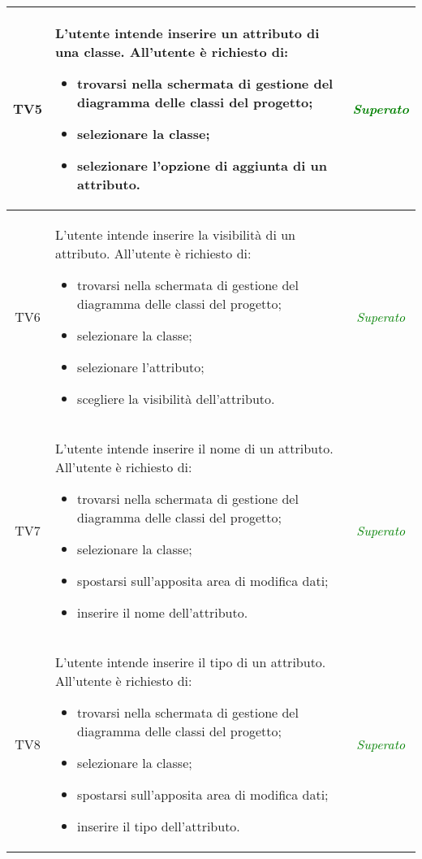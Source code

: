 \begin{longtable}{|c|>{}m{8cm}|c|}
\hypertarget{TV5}{TV5} & L'utente intende inserire un attributo di una classe.
All'utente è richiesto di:
\begin{itemize}
	\item trovarsi nella schermata di gestione del diagramma delle classi del progetto;
	\item selezionare la classe;
	\item selezionare l'opzione di aggiunta di un attributo.
\end{itemize} & \textcolor{Green}{\textit{Superato}}\\ \hline

\hypertarget{TV6}{TV6} & L'utente intende inserire la visibilità di un attributo.
All'utente è richiesto di:
\begin{itemize}
	\item trovarsi nella schermata di gestione del diagramma delle classi del progetto;
	\item selezionare la classe;
	\item selezionare l'attributo;
	\item scegliere la visibilità dell'attributo.
\end{itemize} & \textcolor{Green}{\textit{Superato}}\\ \hline

\hypertarget{TV7}{TV7} & L'utente intende inserire il nome di un attributo.
All'utente è richiesto di:
\begin{itemize}
	\item trovarsi nella schermata di gestione del diagramma delle classi del progetto;
	\item selezionare la classe;
	\item spostarsi sull'apposita area di modifica dati; 
	\item inserire il nome dell'attributo.
\end{itemize} & \textcolor{Green}{\textit{Superato}}\\ \hline

\hypertarget{TV3.1.4.3}{TV8} & L'utente intende inserire il tipo di un attributo.
All'utente è richiesto di:
\begin{itemize}
	\item trovarsi nella schermata di gestione del diagramma delle classi del progetto;
	\item selezionare la classe;
	\item spostarsi sull'apposita area di modifica dati;
	\item inserire il tipo dell'attributo.
\end{itemize} & \textcolor{Green}{\textit{Superato}}\\ \hline


\end{longtable}
